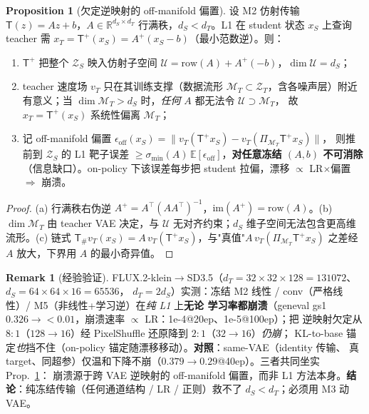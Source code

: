 \documentclass[11pt,a4paper]{article}
\newcommand{\E}{\mathbb{E}}
\newcommand{\R}{\mathbb{R}}
\newcommand{\Zt}{\mathcal{Z}_T}
\newcommand{\Zs}{\mathcal{Z}_S}
\newcommand{\Tmap}{\mathsf{T}}
\newcommand{\push}{\#}
\newcommand{\vT}{v_{T}}
\theoremstyle{definition}
\newtheorem{remark}{Remark}
\newtheorem{proposition}{Proposition}
\begin{document}
\begin{proposition}[欠定逆映射的 off-manifold 偏置]
\label{prop:inverse-deficit}
设 M2 仿射传输 $\Tmap(z)=Az+b$，$A\in\R^{d_S\times d_T}$ 行满秩，$d_S<d_T$。L1 在 student 状态
$x_S$ 上查询 teacher 需 $x_T=\Tmap^{+}(x_S)=A^{+}(x_S-b)$（最小范数逆）。则：
\begin{enumerate}[leftmargin=1.6em,label=(\alph*)]
\item $\Tmap^{+}$ 把整个 $\Zs$ 映入仿射子空间 $\mathcal{U}=\mathrm{row}(A)+A^{+}(-b)$，$\dim\mathcal{U}=d_S$；
\item teacher 速度场 $\vT$ 只在其训练支撑（数据流形 $\mathcal{M}_T\subset\Zt$，含各噪声层）附近
有意义；当 $\dim\mathcal{M}_T>d_S$ 时，\emph{任何} $A$ 都无法令 $\mathcal{U}\supset\mathcal{M}_T$，
故 $x_T=\Tmap^{+}(x_S)$ 系统性偏离 $\mathcal{M}_T$；
\item 记 off-manifold 偏置 $\epsilon_{\mathrm{off}}(x_S)=\lVert \vT(\Tmap^{+}x_S)-\vT(\Pi_{\mathcal{M}_T}\Tmap^{+}x_S)\rVert$，
则推前到 $\Zs$ 的 L1 靶子误差 $\ge \sigma_{\min}(A)\,\E[\epsilon_{\mathrm{off}}]$，\textbf{对任意冻结
$(A,b)$ 不可消除}（信息缺口）。on-policy 下该误差每步把 student 拉偏，漂移 $\propto$ LR$\times$偏置
$\Rightarrow$ 崩溃。
\end{enumerate}
\end{proposition}
\begin{proof}
(a) 行满秩右伪逆 $A^{+}=A^\top(AA^\top)^{-1}$，$\mathrm{im}(A^{+})=\mathrm{row}(A)$。(b) $\dim\mathcal{M}_T$
由 teacher VAE 决定，与 $\mathcal{U}$ 无对齐约束；$d_S$ 维子空间无法包含更高维流形。(c) 链式
$\Tmap_\push\vT(x_S)=A\,\vT(\Tmap^{+}x_S)$，与"真值"$A\,\vT(\Pi_{\mathcal{M}_T}\Tmap^{+}x_S)$ 之差经
$A$ 放大，下界用 $A$ 的最小奇异值。\end{proof}

\begin{remark}[经验验证]
\label{rem:collapse-empirical}
FLUX.2-klein$\to$SD3.5（$d_T{=}32{\times}32{\times}128{=}131072$、$d_S{=}64{\times}64{\times}16{=}65536$，
$d_T{=}2d_S$）实测：冻结 M2 线性 / conv（严格线性）/ M5（非线性+学习逆）在\emph{纯 L1} 上\textbf{无论
学习率都崩溃}（geneval gs1 $0.326\!\to\!{<}0.01$，崩溃速率 $\propto$ LR：1e-4@20ep、1e-5@100ep）；把
逆映射欠定从 $8{:}1$（$128{\to}16$）经 PixelShuffle 还原降到 $2{:}1$（$32{\to}16$）\emph{仍崩}；
KL-to-base 锚定\emph{也}挡不住（on-policy 锚定随漂移移动）。\textbf{对照}：same-VAE（identity 传输、
真 target、同超参）仅温和下降不崩（$0.379\!\to\!0.29$@40ep）。三者共同坐实 Prop.~\ref{prop:inverse-deficit}：
崩溃源于跨 VAE 逆映射的 off-manifold 偏置，而非 L1 方法本身。\textbf{结论}：纯冻结传输（任何通道结构 /
LR / 正则）救不了 $d_S<d_T$；必须用 M3 动 VAE。
\end{remark}
\end{document}
